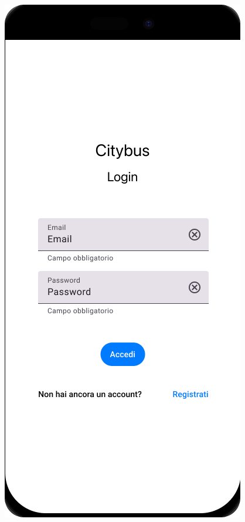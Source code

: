 \begin{figure}[H]
  \centering
  \begin{minipage}[b]{0.25\textwidth}
    \centering
    \includegraphics[width=\textwidth]{images/mockup/Login.png}

\end{minipage}
\end{figure}
